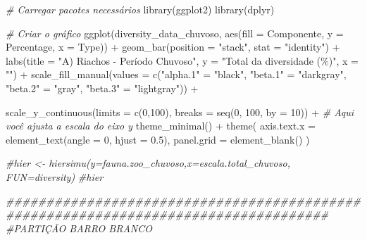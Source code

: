 \documentclass[
  letterpaper,
  DIV=11,
  numbers=noendperiod]{scrartcl}
\newenvironment{Shaded}{}{}
\newcommand{\AttributeTok}[1]{\textcolor[rgb]{0.49,0.56,0.16}{#1}}
\newcommand{\CommentTok}[1]{\textcolor[rgb]{0.38,0.63,0.69}{\textit{#1}}}
\newcommand{\DecValTok}[1]{\textcolor[rgb]{0.25,0.63,0.44}{#1}}
\newcommand{\DocumentationTok}[1]{\textcolor[rgb]{0.73,0.13,0.13}{\textit{#1}}}
\newcommand{\FloatTok}[1]{\textcolor[rgb]{0.25,0.63,0.44}{#1}}
\newcommand{\FunctionTok}[1]{\textcolor[rgb]{0.02,0.16,0.49}{#1}}
\newcommand{\NormalTok}[1]{#1}
\newcommand{\OtherTok}[1]{\textcolor[rgb]{0.00,0.44,0.13}{#1}}
\newcommand{\SpecialCharTok}[1]{\textcolor[rgb]{0.25,0.44,0.63}{#1}}
\newcommand{\StringTok}[1]{\textcolor[rgb]{0.25,0.44,0.63}{#1}}
\begin{document}
\begin{Shaded}
\begin{Highlighting}[numbers=left,,]
\CommentTok{\# Carregar pacotes necessários}
\FunctionTok{library}\NormalTok{(ggplot2)}
\FunctionTok{library}\NormalTok{(dplyr)}

\CommentTok{\# Criar o gráfico}
\FunctionTok{ggplot}\NormalTok{(diversity\_data\_chuvoso, }\FunctionTok{aes}\NormalTok{(}\AttributeTok{fill =}\NormalTok{ Componente, }\AttributeTok{y =}\NormalTok{ Percentage, }\AttributeTok{x =}\NormalTok{ Type)) }\SpecialCharTok{+}
  \FunctionTok{geom\_bar}\NormalTok{(}\AttributeTok{position =} \StringTok{"stack"}\NormalTok{, }\AttributeTok{stat =} \StringTok{"identity"}\NormalTok{) }\SpecialCharTok{+}
  \FunctionTok{labs}\NormalTok{(}\AttributeTok{title =} \StringTok{"A) Riachos {-} Período Chuvoso"}\NormalTok{,}
       \AttributeTok{y =} \StringTok{"Total da diversidade (\%)"}\NormalTok{,}
       \AttributeTok{x =} \StringTok{""}\NormalTok{) }\SpecialCharTok{+}
  \FunctionTok{scale\_fill\_manual}\NormalTok{(}\AttributeTok{values =} \FunctionTok{c}\NormalTok{(}\StringTok{"alpha.1"} \OtherTok{=} \StringTok{"black"}\NormalTok{,}
                               \StringTok{"beta.1"} \OtherTok{=} \StringTok{"darkgray"}\NormalTok{,}
                               \StringTok{"beta.2"} \OtherTok{=} \StringTok{"gray"}\NormalTok{,}
                               \StringTok{"beta.3"} \OtherTok{=} \StringTok{"lightgray"}\NormalTok{)) }\SpecialCharTok{+}
  
  \FunctionTok{scale\_y\_continuous}\NormalTok{(}\AttributeTok{limits =} \FunctionTok{c}\NormalTok{(}\DecValTok{0}\NormalTok{,}\DecValTok{100}\NormalTok{), }\AttributeTok{breaks =} \FunctionTok{seq}\NormalTok{(}\DecValTok{0}\NormalTok{, }\DecValTok{100}\NormalTok{, }\AttributeTok{by =} \DecValTok{10}\NormalTok{)) }\SpecialCharTok{+} \CommentTok{\# Aqui você ajusta a escala do eixo y}
  \FunctionTok{theme\_minimal}\NormalTok{() }\SpecialCharTok{+}
  \FunctionTok{theme}\NormalTok{(}
    \AttributeTok{axis.text.x =} \FunctionTok{element\_text}\NormalTok{(}\AttributeTok{angle =} \DecValTok{0}\NormalTok{, }\AttributeTok{hjust =} \FloatTok{0.5}\NormalTok{),}
    \AttributeTok{panel.grid =} \FunctionTok{element\_blank}\NormalTok{()}
\NormalTok{  )}

\CommentTok{\#hier \textless{}{-} hiersimu(y=fauna.zoo\_chuvoso,x=escala.total\_chuvoso, FUN=diversity)}
\CommentTok{\#hier}

\DocumentationTok{\#\#\#\#\#\#\#\#\#\#\#\#\#\#\#\#\#\#\#\#\#\#\#\#\#\#\#\#\#\#\#\#\#\#\#\#\#\#\#\#\#\#\#\#\#\#\#\#\#\#\#\#\#\#\#\#\#\#\#\#\#\#\#\#\#\#\#\#\#\#\#\#\#\#\#\#\#\#\#\#\#\#\#\#}
\CommentTok{\#PARTIÇÃO BARRO BRANCO}


\end{Highlighting}
\end{Shaded}
\end{document}
